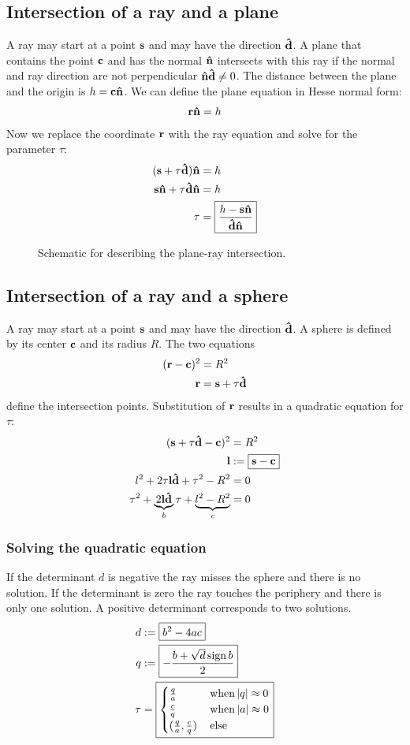 \documentclass[twocolumn,DIV19]{scrartcl}
\DeclareMathOperator{\sign}{sign}
\begin{document}
\subsection{Intersection of a ray and a plane}
A ray may start at a point $\mathbf{s}$ and may have the direction $\mathbf{\hat{d}}$.  A
plane that contains the point $\mathbf{c}$ and has the normal $\mathbf{\hat{n}}$ intersects
with this ray if the normal and ray direction are not perpendicular
$\mathbf{\hat{n}}\mathbf{\hat{d}}\not=0$. The distance between the plane and the origin is
$h=\mathbf{c}\mathbf{\hat{n}}$. We can define the plane equation in Hesse normal form:  
\begin{align}
  \mathbf{r}\mathbf{\hat{n}}=h
\end{align}
Now we replace the coordinate $\mathbf{r}$ with the ray equation and solve for
the parameter $\tau$:
\begin{align}
  (\mathbf{s}+\tau\mathbf{\hat{d}})\mathbf{\hat{n}}&=h\\
  \mathbf{s}\mathbf{\hat{n}}+\tau\mathbf{\hat{d}}\mathbf{\hat{n}}&=h\\
  \tau&=\boxed{\frac{h-\mathbf{s}\mathbf{\hat{n}}}{\mathbf{\hat{d}}\mathbf{\hat{n}}}}
\end{align}
 \begin{figure}[!hbt]
   \centering
   
   \caption{Schematic for describing the plane-ray intersection.}
 \end{figure}
\subsection{Intersection of a ray and a sphere}
A ray may start at a point $\mathbf{s}$ and may have the direction $\mathbf{\hat{d}}$.  A
sphere is defined by its center $\mathbf{c}$ and its radius $R$.  The two
equations
\begin{align}
  (\mathbf{r}-\mathbf{c})^2&=R^2\\
  \mathbf{r}&=\mathbf{s}+\tau\mathbf{\hat{d}}
\end{align}
define the intersection points. Substitution of $\mathbf{r}$ results in a
quadratic equation for $\tau$:
\begin{align}
  (\mathbf{s}+\tau\mathbf{\hat{d}}-\mathbf{c})^2&=R^2\\
  \mathbf{l}&:=\boxed{\mathbf{s}-\mathbf{c}}\\
  l^2+2\tau\mathbf{l}\mathbf{\hat{d}}+\tau^2-R^2&=0\\
  \tau^2+\underbrace{2\mathbf{l}\mathbf{\hat{d}}}_b\tau+\underbrace{l^2-R^2}_c&=0
\end{align}
\subsubsection{Solving the quadratic equation}
If the determinant $d$ is negative the ray misses the sphere and there
is no solution. If the determinant is zero the ray touches the
periphery and there is only one solution. A positive determinant
corresponds to two solutions.
\begin{align}
  d&:=\boxed{b^2-4ac}\\
  q&:=\boxed{-\frac{b+\sqrt{d}\sign b}{2}}\\
  \tau&=\boxed{
  \begin{cases}
    \frac{q}{a} &\,\textrm{when}\,\abs{q}\approx 0\\ 
    \frac{c}{q} &\,\textrm{when}\,\abs{a}\approx 0\\
    (\frac{q}{a}, \frac{c}{q}) &\,\textrm{else}
  \end{cases}}
\end{align}
\end{document}
